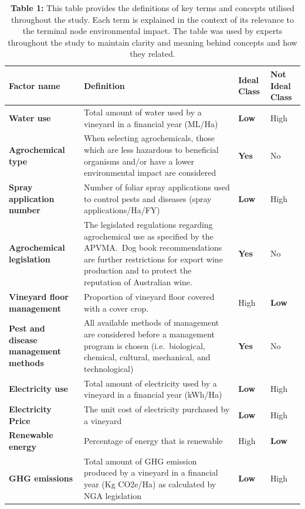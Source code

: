 \documentclass[fleqn,10pt]{wlscirep}
\begin{document}
\begin{table}[h]\label{tab:definitions} 
    \begin{tabular}{@{}llll@{}}
        \caption{\textbf{Table 1:} This table provides the definitions of key terms and concepts utilised throughout the study. Each term is explained in the context of its relevance to the terminal node environmental impact. The table was used by experts throughout the study to maintain clarity and meaning behind concepts and how they related.}
    \toprule
    \textbf{Factor name} & Definition & \textbf{Ideal Class} & Not Ideal Class \\ \midrule
    \textbf{Water use} & Total amount of water used by a vineyard in a financial year (ML/Ha) & \textbf{Low} & High \\
    \textbf{Agrochemical type} & When selecting agrochemicals, those which are less hazardous to beneficial organisms and/or have a lower environmental impact are considered & \textbf{Yes} & No \\
    \textbf{Spray application number} & Number of foliar spray applications used to control pests and diseases (spray applications/Ha/FY) & \textbf{Low} & High \\
    \textbf{Agrochemical legislation} & The legislated regulations regarding agrochemical use as specified by the APVMA.~Dog book recommendations are further restrictions for export wine production and to protect the reputation of Australian wine. & \textbf{Yes} & No \\
    \textbf{Vineyard floor management} & Proportion of vineyard floor covered with a cover crop. & High & \textbf{Low} \\
    \textbf{Pest and disease management methods} & All available methods of management are considered before a management program is chosen (i.e.~biological, chemical, cultural, mechanical, and technological) & \textbf{Yes} & No \\
    \textbf{Electricity use} & Total amount of electricity used by a vineyard in a financial year (kWh/Ha) & \textbf{Low} & High \\
    \textbf{Electricity Price} & The unit cost of electricity purchased by a vineyard & \textbf{Low} & High \\
    \textbf{Renewable energy} & Percentage of energy that is renewable & High & \textbf{Low} \\
    \textbf{GHG emissions} & Total amount of GHG emission produced by a vineyard in a financial year (Kg CO2e/Ha) as calculated  by NGA legislation & \textbf{Low} & High \\

\end{tabular}
\end{table}
\end{document}
